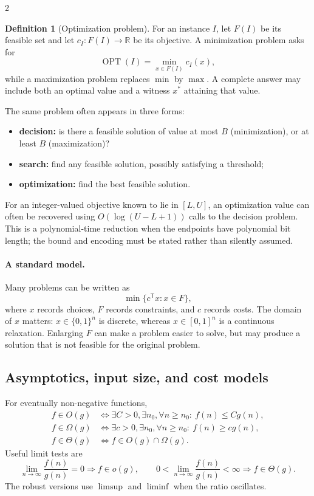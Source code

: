 \documentclass[10pt]{article}
\theoremstyle{definition}
\newtheorem{definition}{Definition}[section]
\newcommand{\OPT}{\operatorname{OPT}}
\begin{document}
\begin{multicols*}{2}
\begin{definition}[Optimization problem]
For an instance $I$, let $F(I)$ be its feasible set and let
$c_I\colon F(I)\to\mathbb{R}$ be its objective.  A minimization problem asks
for
\[
  \OPT(I)=\min_{x\in F(I)}c_I(x),
\]
while a maximization problem replaces $\min$ by $\max$.  A complete answer may
include both an optimal value and a witness $x^*$ attaining that value.
\end{definition}

The same problem often appears in three forms:
\begin{itemize}
  \item \textbf{decision:} is there a feasible solution of value at most $B$
        (minimization), or at least $B$ (maximization)?
  \item \textbf{search:} find any feasible solution, possibly satisfying a
        threshold;
  \item \textbf{optimization:} find the best feasible solution.
\end{itemize}
For an integer-valued objective known to lie in $[L,U]$, an optimization value
can often be recovered using $O(\log(U-L+1))$ calls to the decision problem.
This is a polynomial-time reduction when the endpoints have polynomial bit
length; the bound and encoding must be stated rather than silently assumed.

\paragraph{A standard model.}
Many problems can be written as
\[
  \min\{c^{\mathsf T}x:x\in F\},
\]
where $x$ records choices, $F$ records constraints, and $c$ records costs.
The domain of $x$ matters: $x\in\{0,1\}^n$ is discrete, whereas
$x\in[0,1]^n$ is a continuous relaxation.  Enlarging $F$ can make a problem
easier to solve, but may produce a solution that is not feasible for the
original problem.

\subsection{Asymptotics, input size, and cost models}

For eventually non-negative functions,
\begin{align*}
f\in O(g)
&\iff \exists C>0,\exists n_0,\forall n\ge n_0:\ f(n)\le Cg(n),\\
f\in \Omega(g)
&\iff \exists c>0,\exists n_0,\forall n\ge n_0:\ f(n)\ge cg(n),\\
f\in \Theta(g)
&\iff f\in O(g)\cap\Omega(g).
\end{align*}
Useful limit tests are
\[
\lim_{n\to\infty}\frac{f(n)}{g(n)}=0\Rightarrow f\in o(g),\qquad
0<\lim_{n\to\infty}\frac{f(n)}{g(n)}<\infty\Rightarrow f\in\Theta(g).
\]
The robust versions use $\limsup$ and $\liminf$ when the ratio oscillates.


\end{multicols*}
\end{document}
